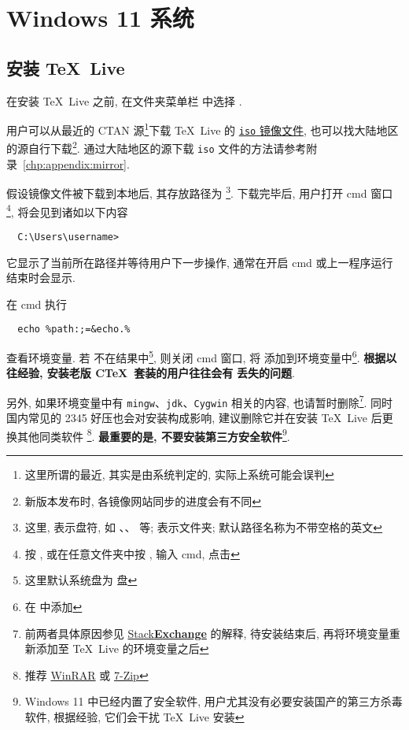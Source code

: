 
\chapter{Windows 11 系统}

\section{安装 \TeX~Live}\label{sec:windows:install}

在安装 \TeX~Live 之前,
在文件夹菜单栏  中选择 .

用户可以从最近的 CTAN 源\footnote{这里所谓的最近, 其实是由系统判定的, 实际上系统可能会误判}下载 \TeX~Live 的
\href{https://mirrors.ctan.org/systems/texlive/Images/texlive2025.iso}{\texttt{iso} 镜像文件},
也可以找大陆地区的源自行下载\footnote{新版本发布时, 各镜像网站同步的进度会有不同}.
通过大陆地区的源下载 \texttt{iso} 文件的方法请参考附录~\ref{chp:appendix:mirror}.

假设镜像文件被下载到本地后,
其存放路径为 %
\footnote{这里,  表示盘符,
如 、、 等;
 表示文件夹;
默认路径名称为不带空格的英文}.
下载完毕后, 用户打开 \textsf{cmd} 窗口%
\footnote{按 \keys{\faWindows},
或在任意文件夹中按 ,
输入 \textsf{cmd},
点击 \keys{\enter}},
将会见到诸如以下内容
\begin{lstlisting}
  C:\Users\username>
\end{lstlisting}
它显示了当前所在路径并等待用户下一步操作,
通常在开启 \textsf{cmd} 或上一程序运行结束时会显示.

在 \textsf{cmd} 执行
\begin{lstlisting}
  echo %path:;=&echo.%
\end{lstlisting}
查看环境变量. 
若 
不在结果中\footnote{这里默认系统盘为  盘},
则关闭 \textsf{cmd} 窗口,
将 
添加到环境变量中\footnote{在  中添加}.
\textbf{根据以往经验, 安装老版 C\TeX\ 套装的用户往往会有}  \textbf{丢失的问题}. 

另外, 如果环境变量中有 \texttt{mingw}、\texttt{jdk}、\texttt{Cygwin} 相关的内容,
也请暂时删除\footnote{前两者具体原因参见
\href{https://tex.stackexchange.com/questions/445086/error-installing-latest-version-of-tex-live-on-windows-10}{\textsf{Stack\textbf{Exchange}}}
的解释, 待安装结束后, 再将环境变量重新添加至 \TeX~Live 的环境变量之后}.
同时国内常见的 2345 好压也会对安装构成影响,
建议删除它并在安装 \TeX~Live 后更换其他同类软件%
\footnote{推荐 \href{http://www.winrar.com.cn}{WinRAR}
或 \href{https://www.7-zip.org}{7-Zip}}.
\textbf{最重要的是, 不要安装第三方安全软件}\footnote{Windows 11 中已经内置了安全软件,
用户尤其没有必要安装国产的第三方杀毒软件,
根据经验,
它们会干扰 \TeX~Live 安装}.

